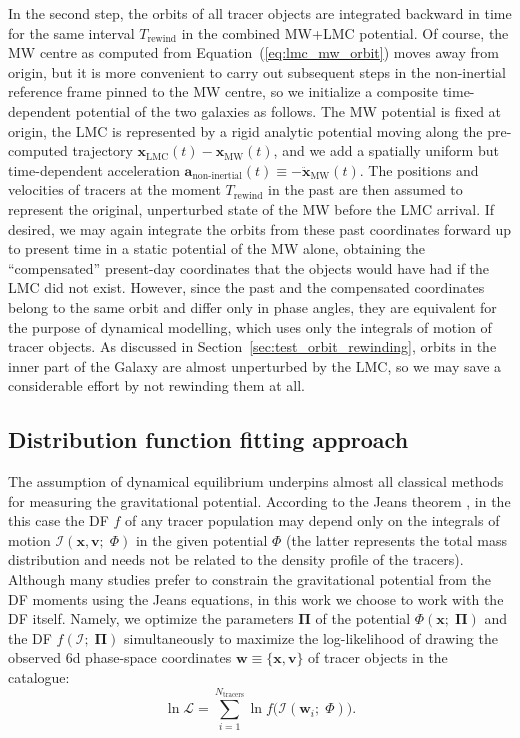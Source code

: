 \documentclass[usenatbib,fleqn]{mnras}
\begin{document}
In the second step, the orbits of all tracer objects are integrated backward in time for the same interval $T_\text{rewind}$ in the combined MW+LMC potential. Of course, the MW centre as computed from Equation~(\ref{eq:lmc_mw_orbit}) moves away from origin, but it is more convenient to carry out subsequent steps in the non-inertial reference frame pinned to the MW centre, so we initialize a composite time-dependent potential of the two galaxies as follows. The MW potential is fixed at origin, the LMC is represented by a rigid analytic potential moving along the pre-computed trajectory $\boldsymbol{x}_\text{LMC}(t)-\boldsymbol{x}_\text{MW}(t)$, and we add a spatially uniform but time-dependent acceleration $\boldsymbol{a}_\text{non-inertial}(t) \equiv -\ddot{\boldsymbol{x}}_\text{MW}(t)$. The positions and velocities of tracers at the moment $T_\text{rewind}$ in the past are then assumed to represent the original, unperturbed state of the MW before the LMC arrival. If desired, we may again integrate the orbits from these past coordinates forward up to present time in a static potential of the MW alone, obtaining the ``compensated'' present-day coordinates that the objects would have had if the LMC did not exist. However, since the past and the compensated coordinates belong to the same orbit and differ only in phase angles, they are equivalent for the purpose of dynamical modelling, which uses only the integrals of motion of tracer objects. As discussed in Section~\ref{sec:test_orbit_rewinding}, orbits in the inner part of the Galaxy are almost unperturbed by the LMC, so we may save a considerable effort by not rewinding them at all.

\subsection{Distribution function fitting approach} \label{sec:df_fit}

The assumption of dynamical equilibrium underpins almost all classical methods for measuring the gravitational potential. According to the Jeans theorem \citep[Chapter~4.2 in][]{Binney2008}, in the this case the DF $f$ of any tracer population may depend only on the integrals of motion $\mathcal I(\boldsymbol x, \boldsymbol v ;\; \Phi)$ in the given potential $\Phi$ (the latter represents the total mass distribution and needs not be related to the density profile of the tracers). Although many studies prefer to constrain the gravitational potential from the DF moments using the Jeans equations, in this work we choose to work with the DF itself. Namely, we optimize the parameters $\boldsymbol{\Pi}$ of the potential $\Phi(\boldsymbol{x};\;\boldsymbol\Pi)$ and the DF $f(\mathcal{I};\;\boldsymbol\Pi)$ simultaneously to maximize the log-likelihood of drawing the observed 6d phase-space coordinates $\boldsymbol w \equiv \{\boldsymbol x, \boldsymbol v\}$ of tracer objects in the catalogue:
\begin{equation}  \label{eq:likelihood}
\ln\mathcal{L} = \sum_{i=1}^{N_\text{tracers}} \ln f\big( \mathcal I(\boldsymbol w_i; \; \Phi )\big).
\end{equation}
\end{document}
